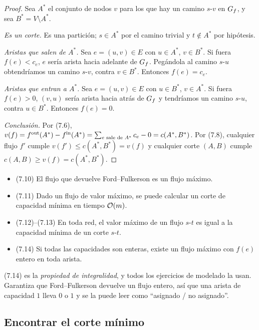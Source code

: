 \begin{proof}
Sea $A^*$ el conjunto de nodos $v$ para los que hay un camino $s$-$v$ en $G_f$, y sea $B^*=V\setminus A^*$.

\emph{Es un corte.} Es una partición; $s\in A^*$ por el camino trivial y $t\notin A^*$ por hipótesis.

\emph{Aristas que salen de $A^*$.} Sea $e=(u,v)\in E$ con $u\in A^*$, $v\in B^*$. Si fuera $f(e)<c_e$, $e$ sería arista hacia adelante de $G_f$. Pegándola al camino $s$-$u$ obtendríamos un camino $s$-$v$, contra $v\in B^*$. Entonces $f(e)=c_e$.

\emph{Aristas que entran a $A^*$.} Sea $e=(u,v)\in E$ con $u\in B^*$, $v\in A^*$. Si fuera $f(e)>0$, $(v,u)$ sería arista hacia atrás de $G_f$ y tendríamos un camino $s$-$u$, contra $u\in B^*$. Entonces $f(e)=0$.

\emph{Conclusión.} Por (7.6),
$v(f)=f^{\mathrm{out}}(A^*)-f^{\mathrm{in}}(A^*)=\sum_{e\text{ sale de }A^*}c_e-0=c(A^*,B^*)$.
Por (7.8), cualquier flujo $f'$ cumple $v(f')\le c(A^*,B^*)=v(f)$ y cualquier corte $(A,B)$ cumple $c(A,B)\ge v(f)=c(A^*,B^*)$.
\end{proof}

\begin{resultado}[(7.10)--(7.14)]
\begin{itemize}
  \item (7.10) El flujo que devuelve Ford–Fulkerson es un flujo máximo.
  \item (7.11) Dado un flujo de valor máximo, se puede calcular un corte de capacidad mínima en tiempo $\mathcal{O}(m)$.
  \item (7.12)--(7.13) En toda red, el valor máximo de un flujo $s$-$t$ es igual a la capacidad mínima de un corte $s$-$t$.
  \item (7.14) Si todas las capacidades son enteras, existe un flujo máximo con $f(e)$ entero en toda arista.
\end{itemize}
\end{resultado}

(7.14) es la \emph{propiedad de integralidad}, y todos los ejercicios de modelado la usan. Garantiza que Ford–Fulkerson devuelve un flujo entero, así que una arista de capacidad $1$ lleva $0$ o $1$ y se la puede leer como ``asignado / no asignado''.

\subsection{Encontrar el corte mínimo}

